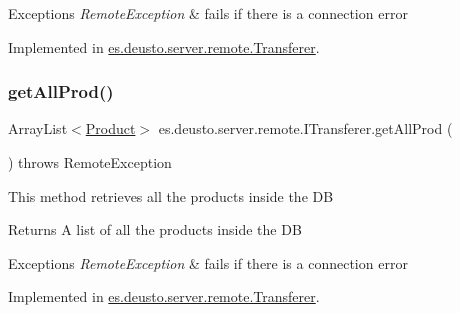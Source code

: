 \begin{DoxyExceptions}{Exceptions}
{\em Remote\+Exception} & fails if there is a connection error \\
\hline
\end{DoxyExceptions}


Implemented in \hyperlink{classes_1_1deusto_1_1server_1_1remote_1_1_transferer_ad5868dd67ee9a53e7cdf0c30e08a3a1b}{es.\+deusto.\+server.\+remote.\+Transferer}.

\mbox{\label{interfacees_1_1deusto_1_1server_1_1remote_1_1_i_transferer_a71afa6799122b3f09805f86d2e58fc23}} 
\subsubsection{\texorpdfstring{get\+All\+Prod()}{getAllProd()}}
{\footnotesize\ttfamily Array\+List$<$\hyperlink{classes_1_1deusto_1_1server_1_1db_1_1data_1_1_product}{Product}$>$ es.\+deusto.\+server.\+remote.\+I\+Transferer.\+get\+All\+Prod (\begin{DoxyParamCaption}{ }\end{DoxyParamCaption}) throws Remote\+Exception}

This method retrieves all the products inside the DB \begin{DoxyReturn}{Returns}
A list of all the products inside the DB 
\end{DoxyReturn}

\begin{DoxyExceptions}{Exceptions}
{\em Remote\+Exception} & fails if there is a connection error \\
\hline
\end{DoxyExceptions}


Implemented in \hyperlink{classes_1_1deusto_1_1server_1_1remote_1_1_transferer_a29cbb75edeb4e0973780fd379ef2b3fb}{es.\+deusto.\+server.\+remote.\+Transferer}.

\mbox{\label{interfacees_1_1deusto_1_1server_1_1remote_1_1_i_transferer_aec6609427d773f075a78295a97888103}} 
